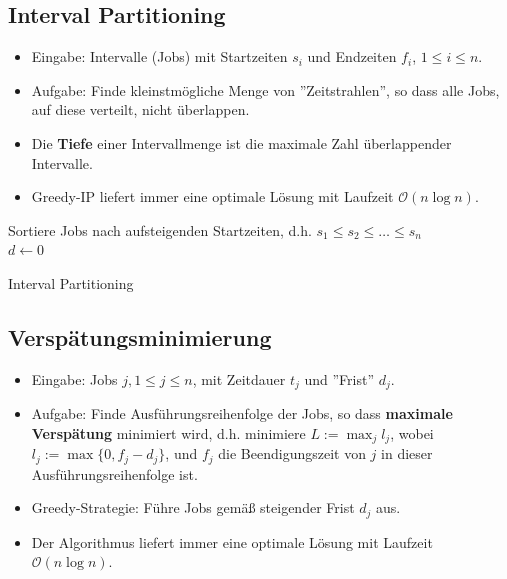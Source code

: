 \documentclass{scrartcl}
\begin{document}
\subsection{Interval Partitioning}

\begin{itemize}
	\item Eingabe: Intervalle (Jobs) mit Startzeiten $ s_i $ und Endzeiten $ f_i $, $ 1 \leq i \leq n $.
	\item Aufgabe: Finde kleinstmögliche Menge von ''Zeitstrahlen'', so dass alle Jobs, auf diese verteilt, nicht überlappen.
	\item Die \textbf{Tiefe} einer Intervallmenge ist die maximale Zahl überlappender Intervalle.
	\item Greedy-IP liefert immer eine optimale Lösung mit Laufzeit $ \mathcal{O}(n \log n) $.
\end{itemize}

\begin{algorithm}[H]
	Sortiere Jobs nach aufsteigenden Startzeiten, d.h. $ s_1 \leq s_2 \leq \ldots \leq s_n $ \\
	$ d \leftarrow 0 $ \\
	\caption{Interval Partitioning}
\end{algorithm}

\subsection{Verspätungsminimierung}

\begin{itemize}
	\item Eingabe: Jobs $ j, 1 \leq j \leq n $, mit Zeitdauer $ t_j $ und ''Frist'' $ d_j $.
	\item Aufgabe: Finde Ausführungsreihenfolge der Jobs, so dass \textbf{maximale Verspätung} minimiert wird, d.h. minimiere $ L := \max_j l_j $, wobei $ l_j := \max \{ 0, f_j - d_j \} $, und $ f_j $ die Beendigungszeit von $ j $ in dieser Ausführungsreihenfolge ist.
	\item Greedy-Strategie: Führe Jobs gemäß steigender Frist $ d_j $ aus.
	\item Der Algorithmus liefert immer eine optimale Lösung mit Laufzeit $ \mathcal{O}(n \log n) $.
\end{itemize}
\end{document}
